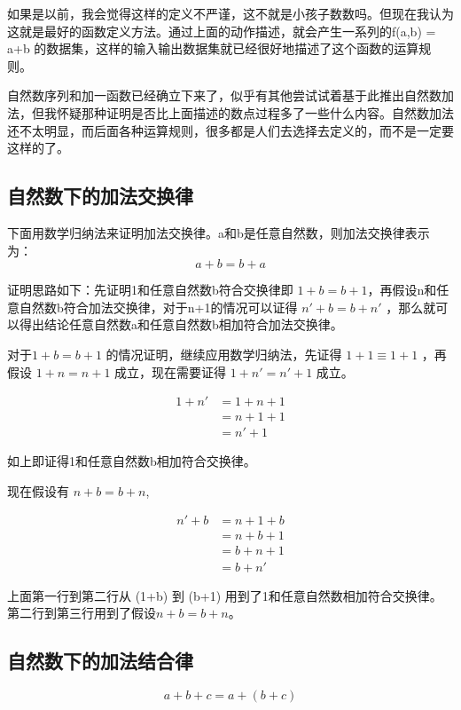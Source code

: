 \documentclass[12pt,oneside]{book}
\begin{document}
如果是以前，我会觉得这样的定义不严谨，这不就是小孩子数数吗。但现在我认为这就是最好的函数定义方法。通过上面的动作描述，就会产生一系列的f(a,b) = a+b 的数据集，这样的输入输出数据集就已经很好地描述了这个函数的运算规则。

自然数序列和加一函数已经确立下来了，似乎有其他尝试试着基于此推出自然数加法，但我怀疑那种证明是否比上面描述的数点过程多了一些什么内容。自然数加法还不太明显，而后面各种运算规则，很多都是人们去选择去定义的，而不是一定要这样的了。


\subsection{自然数下的加法交换律}
下面用数学归纳法来证明加法交换律。a和b是任意自然数，则加法交换律表示为：
\begin{equation}
a+b=b+a
\end{equation}

证明思路如下：先证明1和任意自然数b符合交换律即 $1+b = b+1$，再假设n和任意自然数b符合加法交换律，对于n+1的情况可以证得 $n'+b=b+n'$ ，那么就可以得出结论任意自然数a和任意自然数b相加符合加法交换律。

对于$1+b=b+1$ 的情况证明，继续应用数学归纳法，先证得 $1+1\equiv 1+1$ ，再假设 $1+n=n+1$ 成立，现在需要证得 $1+n'=n'+1$ 成立。

\begin{align}
1+n' &= 1+n+1\\
        &= n+1+1 \\
        &=n'+1
\end{align}

如上即证得1和任意自然数b相加符合交换律。

现在假设有 $n+b=b+n$,

\begin{align}
n'+b &=n+1+b\\
        &=n+b+1\\
        &=b+n+1\\
        &=b+n'
\end{align}

上面第一行到第二行从 (1+b) 到 (b+1) 用到了1和任意自然数相加符合交换律。第二行到第三行用到了假设$n+b=b+n$。

\subsection{自然数下的加法结合律}
\begin{equation}
a + b + c = a + (b + c)
\end{equation}
\end{document}
